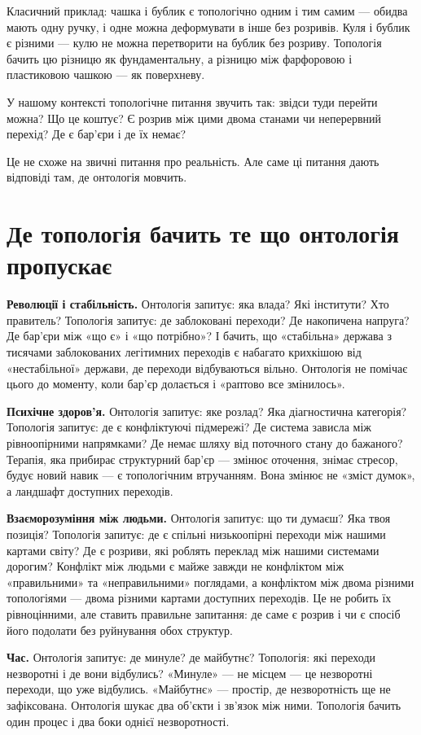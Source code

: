 \documentclass[12pt, a4paper, openany]{book}
\begin{document}
Класичний приклад: чашка і бублик є топологічно одним і тим самим — обидва мають одну ручку, і одне можна деформувати в інше без розривів. Куля і бублик є різними — кулю не можна перетворити на бублик без розриву. Топологія бачить цю різницю як фундаментальну, а різницю між фарфоровою і пластиковою чашкою — як поверхневу.

У нашому контексті топологічне питання звучить так: звідси туди перейти можна? Що це коштує? Є розрив між цими двома станами чи неперервний перехід? Де є бар'єри і де їх немає?

Це не схоже на звичні питання про реальність. Але саме ці питання дають відповіді там, де онтологія мовчить.

\section{Де топологія бачить те що онтологія пропускає}

\textbf{Революції і стабільність.} Онтологія запитує: яка влада? Які інститути? Хто правитель? Топологія запитує: де заблоковані переходи? Де накопичена напруга? Де бар'єри між «що є» і «що потрібно»? І бачить, що «стабільна» держава з тисячами заблокованих легітимних переходів є набагато крихкішою від «нестабільної» держави, де переходи відбуваються вільно. Онтологія не помічає цього до моменту, коли бар'єр долається і «раптово все змінилось».

\textbf{Психічне здоров'я.} Онтологія запитує: яке розлад? Яка діагностична категорія? Топологія запитує: де є конфліктуючі підмережі? Де система зависла між рівноопірними напрямками? Де немає шляху від поточного стану до бажаного? Терапія, яка прибирає структурний бар'єр — змінює оточення, знімає стресор, будує новий навик — є топологічним втручанням. Вона змінює не «зміст думок», а ландшафт доступних переходів.

\textbf{Взаєморозуміння між людьми.} Онтологія запитує: що ти думаєш? Яка твоя позиція? Топологія запитує: де є спільні низькоопірні переходи між нашими картами світу? Де є розриви, які роблять переклад між нашими системами дорогим? Конфлікт між людьми є майже завжди не конфліктом між «правильними» та «неправильними» поглядами, а конфліктом між двома різними топологіями — двома різними картами доступних переходів. Це не робить їх рівноцінними, але ставить правильне запитання: де саме є розрив і чи є спосіб його подолати без руйнування обох структур.

\textbf{Час.} Онтологія запитує: де минуле? де майбутнє? Топологія: які переходи незворотні і де вони відбулись? «Минуле» — не місцем — це незворотні переходи, що уже відбулись. «Майбутнє» — простір, де незворотність ще не зафіксована. Онтологія шукає два об'єкти і зв'язок між ними. Топологія бачить один процес і два боки однієї незворотності.
\end{document}
